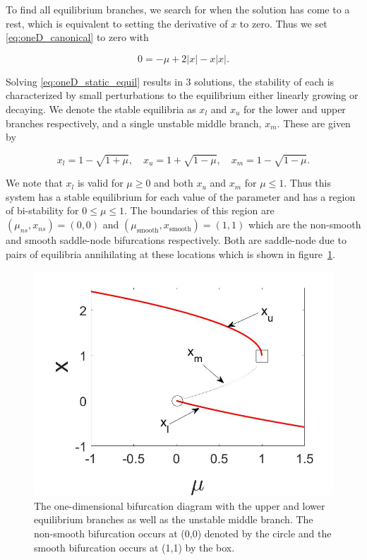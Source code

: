 To find all equilibrium branches, we search for when the solution has come to a rest, which is equivalent to setting the derivative of $x$ to zero. Thus we set \eqref{eq:oneD_canonical} to zero with

\begin{equation}\label{eq:oneD_static_equil}
0=-\mu +2|x|-x|x|.
\end{equation}

Solving \eqref{eq:oneD_static_equil} results in 3 solutions, the stability of each is characterized by small perturbations to the equilibrium either linearly growing or decaying. We denote the stable equilibria as $x_l$ and $x_u$ for the lower and upper branches respectively, and a single unstable middle branch, $x_{m}$. These are given by

\begin{equation*}
x_l=1-\sqrt{1+\mu},\quad x_u=1+\sqrt{1-\mu},\quad
x_{m}=1-\sqrt{1-\mu}.
\end{equation*}

We note that $x_l$ is valid for $\mu\ge 0$ and both $x_u$ and $x_{m}$ for $\mu\le 1$. Thus this system has a stable equilibrium for each value of the parameter and has a region of bi-stability for $0\le \mu\le 1$. The boundaries of this region are ${(\mu_{ns},x_{ns})=(0,0)}$ and $(\mu_{\text{smooth}},x_{\text{smooth}})=(1,1)$ which are the non-smooth and smooth saddle-node bifurcations respectively. Both are saddle-node due to pairs of equilibria annihilating at these locations which is shown in figure~\ref{fig:oneD_static_bifdiagram}.

\begin{figure}[H]
\centering
\includegraphics[width=.8\textwidth]{oneD/bif_diagram.jpg}
\caption{The one-dimensional bifurcation diagram with the upper and lower equilibrium branches as well as the unstable middle branch. The non-smooth bifurcation occurs at (0,0) denoted by the circle and the smooth bifurcation occurs at (1,1) by the box. }
\label{fig:oneD_static_bifdiagram}
\end{figure}



